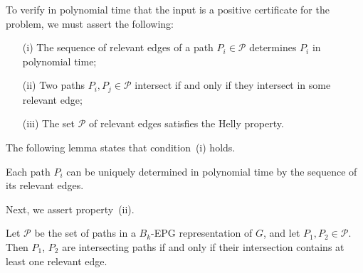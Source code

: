 To verify in polynomial time that the input is a positive certificate for the problem, we must assert the following:

\begin{enumerate}%
\item[(i)] The sequence of relevant edges of a path $P_i\in \mathcal{P}$ determines $P_i$ in polynomial time; \label{it:bullet1}

\item[(ii)] Two paths $P_i, P_j \in \mathcal{P}$ intersect if and only if they intersect in some relevant edge; \label{it:bullet2}

\item[(iii)] The set $\mathcal{P}$ of relevant edges satisfies the Helly property.  \label{it:bullet3}
\end{enumerate}



The following lemma states that condition~(i) holds. 



\begin{lemma}\label{lem:verify1}
Each path $P_i$ can be uniquely determined in polynomial time by the sequence of its relevant edges.
\end{lemma}


Next, we assert property~(ii).

\begin{lemma}\label{lem:relevantEdges}
Let $\mathcal{P}$ be the set of paths in a $B_k$-EPG representation of $G$, and let $P_1, P_2\in \mathcal{P}$. Then $P_1$, $P_2$ are intersecting paths if and only if their intersection contains at least one relevant edge.
\end{lemma}

